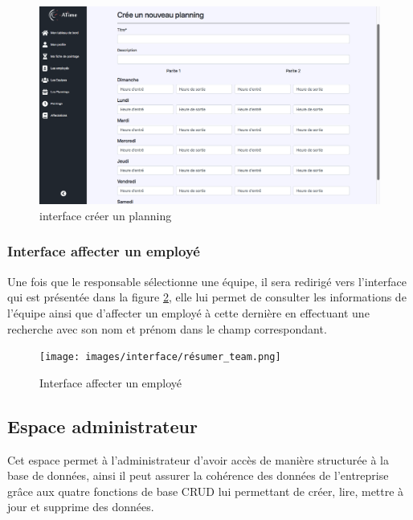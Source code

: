 \begin{figure}[h!]
    \vspace{-10pt}
    \centering
    \includegraphics[scale=0.305 ]{images/interface/add_planning.png}
    \caption{interface créer un planning}
    \label{fig99}
\end{figure}

\vspace{-20pt}
\subsubsection*{Interface affecter un employé}
Une fois que le responsable sélectionne une équipe, il sera redirigé vers 
l'interface qui est présentée dans la figure \ref{fig100}, elle lui permet 
de consulter les informations de l'équipe ainsi que d'affecter un employé à 
cette dernière en effectuant une recherche avec son nom et prénom dans le champ 
correspondant. 

\begin{figure}[h!]
    \centering
    \texttt{[image: images/interface/résumer\_team.png]}
    \caption{Interface affecter un employé}
    \label{fig100}
\end{figure}
            
\clearpage
            
\subsection{Espace administrateur}
Cet espace permet à l’administrateur d’avoir accès de manière structurée à la 
base de données, ainsi il peut assurer la cohérence des données de l’entreprise 
grâce aux quatre fonctions de base CRUD lui permettant de créer, lire, mettre à 
jour et supprime des données.


